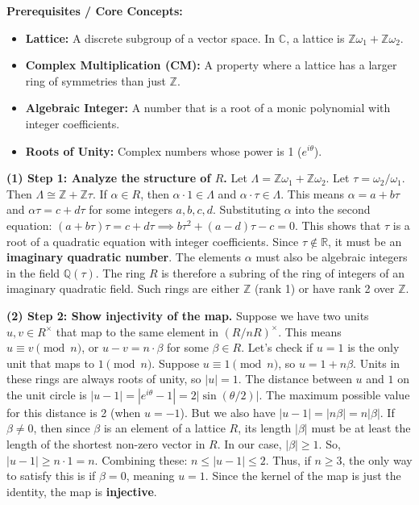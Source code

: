 \begin{solution}
\textbf{Prerequisites / Core Concepts:}
\begin{itemize}
    \item \textbf{Lattice:} A discrete subgroup of a vector space. In $\mathbb{C}$, a lattice is $\mathbb{Z} \omega_1 + \mathbb{Z} \omega_2$.
    \item \textbf{Complex Multiplication (CM):} A property where a lattice has a larger ring of symmetries than just $\mathbb{Z}$.
    \item \textbf{Algebraic Integer:} A number that is a root of a monic polynomial with integer coefficients.
    \item \textbf{Roots of Unity:} Complex numbers whose power is 1 ($e^{i\theta}$).
\end{itemize}

\textbf{(1) Step 1: Analyze the structure of $R$.}
Let $\Lambda = \mathbb{Z} \omega_1 + \mathbb{Z} \omega_2$. Let $\tau = \omega_2 / \omega_1$. Then $\Lambda \cong \mathbb{Z} + \mathbb{Z}\tau$.
If $\alpha \in R$, then $\alpha \cdot 1 \in \Lambda$ and $\alpha \cdot \tau \in \Lambda$.
This means $\alpha = a + b\tau$ and $\alpha \tau = c + d\tau$ for some integers $a, b, c, d$.
Substituting $\alpha$ into the second equation: $(a+b\tau)\tau = c + d\tau \implies b\tau^2 + (a-d)\tau - c = 0$.
This shows that $\tau$ is a root of a quadratic equation with integer coefficients. Since $\tau \notin \mathbb{R}$, it must be an \textbf{imaginary quadratic number}.
The elements $\alpha$ must also be algebraic integers in the field $\mathbb{Q}(\tau)$. 
The ring $R$ is therefore a subring of the ring of integers of an imaginary quadratic field. Such rings are either $\mathbb{Z}$ (rank 1) or have rank 2 over $\mathbb{Z}$.

\textbf{(2) Step 2: Show injectivity of the map.}
Suppose we have two units $u, v \in R^\times$ that map to the same element in $(R/nR)^\times$. This means $u \equiv v \pmod n$, or $u - v = n \cdot \beta$ for some $\beta \in R$.
Let's check if $u=1$ is the only unit that maps to $1 \pmod n$. Suppose $u \equiv 1 \pmod n$, so $u = 1 + n\beta$.
Units in these rings are always roots of unity, so $|u| = 1$.
The distance between $u$ and $1$ on the unit circle is $|u-1| = |e^{i\theta} - 1| = 2|\sin(\theta/2)|$. The maximum possible value for this distance is 2 (when $u=-1$).
But we also have $|u-1| = |n\beta| = n |\beta|$.
If $\beta \neq 0$, then since $\beta$ is an element of a lattice $R$, its length $|\beta|$ must be at least the length of the shortest non-zero vector in $R$. In our case, $|\beta| \geq 1$.
So, $|u-1| \geq n \cdot 1 = n$.
Combining these: $n \leq |u-1| \leq 2$.
Thus, if $n \geq 3$, the only way to satisfy this is if $\beta = 0$, meaning $u=1$.
Since the kernel of the map is just the identity, the map is \textbf{injective}.


\end{solution}

